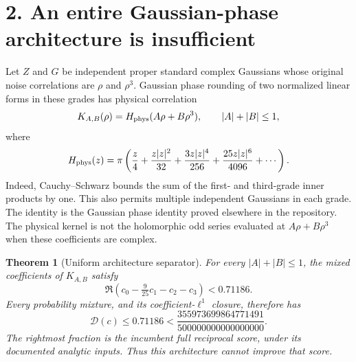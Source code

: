 \documentclass[11pt]{article}
\newcommand{\D}{\mathcal D}
\newtheorem{theorem}{Theorem}
\begin{document}
\section*{2. An entire Gaussian-phase architecture is insufficient}
Let $Z$ and $G$ be independent proper standard complex Gaussians whose original
noise correlations are $\rho$ and $\rho^3$. Gaussian phase rounding of two
normalized linear forms in these grades has physical correlation
\[
 K_{A,B}(\rho)=H_{\rm phys}(A\rho+B\rho^3),\qquad |A|+|B|\le1,
\]
where
\[
 H_{\rm phys}(z)=\pi\left(\frac z4+\frac{z|z|^2}{32}
 +\frac{3z|z|^4}{256}+\frac{25z|z|^6}{4096}+\cdots\right).
\]
Indeed, Cauchy--Schwarz bounds the sum of the first- and third-grade inner
products by one. This also permits multiple independent Gaussians in each
grade. The identity is the Gaussian phase identity proved elsewhere in the
repository. The physical kernel is not the holomorphic odd series evaluated
at $A\rho+B\rho^3$ when these coefficients are complex.

\begin{theorem}[Uniform architecture separator]
For every $|A|+|B|\le1$, the mixed coefficients of $K_{A,B}$ satisfy
\[
 \Re(c_0-\tfrac9{25}c_1-c_2-c_3)<0.71186.
 \tag{5}
\]
Every probability mixture, and its coefficient-$\ell^1$ closure, therefore has
\[
 \boxed{\D(c)\le0.71186<
 \frac{355973699864771491}{500000000000000000}.}\tag{6}
\]
The rightmost fraction is the incumbent full reciprocal score, under its
documented analytic inputs. Thus this architecture cannot improve that score.
\end{theorem}
\end{document}
